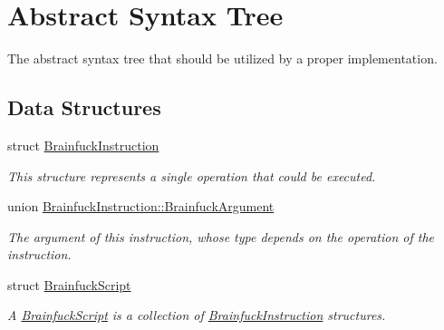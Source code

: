 \hypertarget{group__ast}{}\section{Abstract Syntax Tree}
\label{group__ast}


The abstract syntax tree that should be utilized by a proper implementation.  


\subsection*{Data Structures}
\begin{DoxyCompactItemize}
\item 
struct \hyperlink{structBrainfuckInstruction}{Brainfuck\+Instruction}
\begin{DoxyCompactList}\small\item\em This structure represents a single operation that could be executed. \end{DoxyCompactList}\item 
union \hyperlink{unionBrainfuckInstruction_1_1BrainfuckArgument}{Brainfuck\+Instruction\+::\+Brainfuck\+Argument}
\begin{DoxyCompactList}\small\item\em The argument of this instruction, whose type depends on the operation of the instruction. \end{DoxyCompactList}\item 
struct \hyperlink{structBrainfuckScript}{Brainfuck\+Script}
\begin{DoxyCompactList}\small\item\em A \hyperlink{structBrainfuckScript}{Brainfuck\+Script} is a collection of \hyperlink{structBrainfuckInstruction}{Brainfuck\+Instruction} structures. \end{DoxyCompactList}\end{DoxyCompactItemize}
